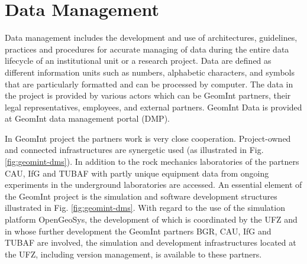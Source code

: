 \chapter{Data Management}
\label{cha:dms}

Data management includes the development and use of architectures, guidelines, practices and procedures for accurate managing of data during the entire data lifecycle of an institutional unit or a research project. Data are defined as different information units such as numbers, alphabetic characters, and symbols that are particularly formatted and can be processed by computer. The data in the project is provided by various actors which can be GeomInt partners, their legal representatives, employees, and external partners. GeomInt Data is provided at GeomInt data management portal (DMP).

In GeomInt project the partners work is very close cooperation. Project-owned and connected infrastructures are synergetic used (as illustrated in Fig. \ref{fig:geomint-dms}). In addition to the rock mechanics laboratories of the partners CAU, IfG and TUBAF with partly unique equipment data from ongoing experiments in the underground laboratories are accessed. An essential element of the GeomInt project is the simulation and software development structures illustrated in Fig. \ref{fig:geomint-dms}. With regard to the use of the simulation platform OpenGeoSys, the development of which is coordinated by the UFZ and in whose further development the GeomInt partners BGR, CAU, IfG and TUBAF are involved, the simulation and development infrastructures located at the UFZ, including version management, is available to these partners. 

